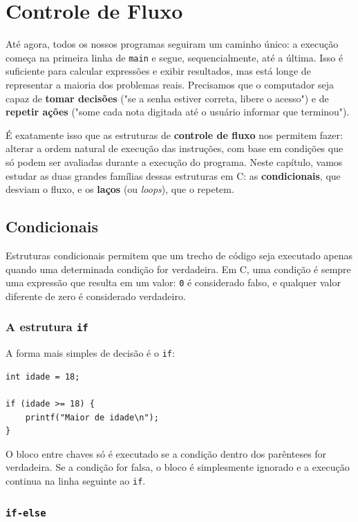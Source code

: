 \chapter{Controle de Fluxo}

Até agora, todos os nossos programas seguiram um caminho único: a execução começa na primeira linha de \texttt{main} e segue, sequencialmente, até a última. Isso é suficiente para calcular expressões e exibir resultados, mas está longe de representar a maioria dos problemas reais. Precisamos que o computador seja capaz de \textbf{tomar decisões} ("se a senha estiver correta, libere o acesso") e de \textbf{repetir ações} ("some cada nota digitada até o usuário informar que terminou").

É exatamente isso que as estruturas de \textbf{controle de fluxo} nos permitem fazer: alterar a ordem natural de execução das instruções, com base em condições que só podem ser avaliadas durante a execução do programa. Neste capítulo, vamos estudar as duas grandes famílias dessas estruturas em C: as \textbf{condicionais}, que desviam o fluxo, e os \textbf{laços} (ou \textit{loops}), que o repetem.

\section{Condicionais}

Estruturas condicionais permitem que um trecho de código seja executado apenas quando uma determinada condição for verdadeira. Em C, uma condição é sempre uma expressão que resulta em um valor: \texttt{0} é considerado falso, e qualquer valor diferente de zero é considerado verdadeiro.

\subsection{A estrutura \texttt{if}}

A forma mais simples de decisão é o \texttt{if}:

\begin{lstlisting}
int idade = 18;

if (idade >= 18) {
    printf("Maior de idade\n");
}
\end{lstlisting}

O bloco entre chaves só é executado se a condição dentro dos parênteses for verdadeira. Se a condição for falsa, o bloco é simplesmente ignorado e a execução continua na linha seguinte ao \texttt{if}.

\subsection{\texttt{if-else}}

